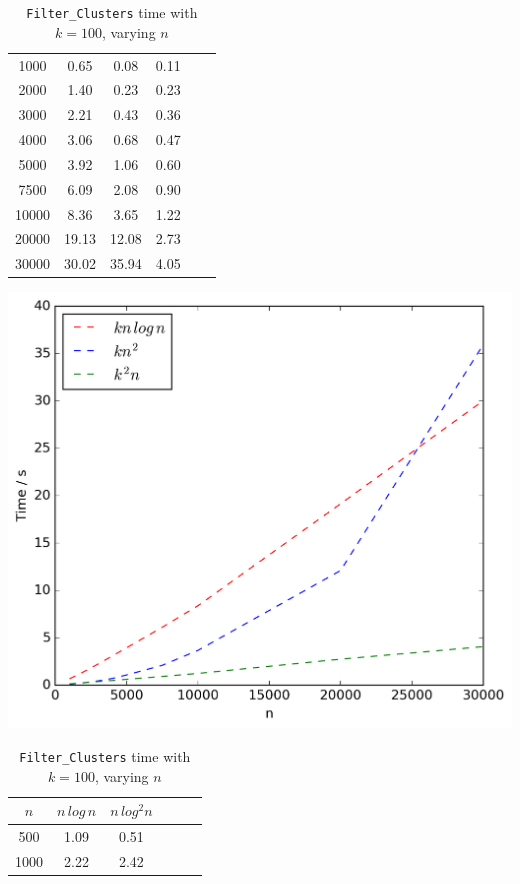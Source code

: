 \documentclass{article}
\begin{document}
\begin{table}[!ht]
\begin{minipage}{0.48\textwidth}
\begin{tabular}{c||ccccc}
                \hline\hline
                1000 & 0.65 & 0.08 & 0.11\\
                2000 & 1.40 & 0.23 & 0.23\\
                3000 & 2.21 & 0.43 & 0.36\\
                4000 & 3.06 & 0.68 & 0.47\\
                5000 & 3.92 & 1.06 & 0.60\\
                7500 & 6.09 & 2.08 & 0.90\\
                10000 & 8.36 & 3.65 & 1.22\\
                20000 & 19.13 & 12.08 & 2.73\\
                30000 & 30.02 & 35.94 & 4.05\\
            \end{tabular}
            \includegraphics[scale=0.4]{varyingn1_weighting}
        \end{minipage}\hfill
        \begin{minipage}{0.48\textwidth}
            \centering
            \caption{\texttt{Filter\_Clusters} time with $k = 100$, varying $n$}
            \label{tab:filtern1}
            \begin{tabular}{c||ccccc}
                $n$ & $n\,log\,n$ & $n\,log^2n$\\
                \hline\hline
                500 & 1.09 & 0.51\\
                1000 & 2.22 & 2.42\\

\end{tabular}
\end{minipage}
\end{table}
\end{document}
